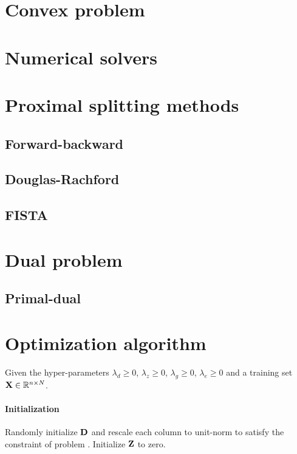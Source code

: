 \section{Convex problem}

\section{Numerical solvers}

\section{Proximal splitting methods}

\subsection{Forward-backward}

\subsection{Douglas-Rachford}

\subsection{FISTA}

\section{Dual problem}

\subsection{Primal-dual}

\section{Optimization algorithm}

Given the hyper-parameters $\lambda_d \geq 0$, $\lambda_z \geq 0$, $\lambda_g \geq 0$, $\lambda_e \geq 0$ and a training set $\mathbf{X} \in \mathbb{R}^{n \times N}$.

\paragraph{Initialization}
Randomly initialize $\mathbf{D}$ and rescale each column to unit-norm to satisfy the constraint of problem . Initialize $\mathbf{Z}$ to zero. %